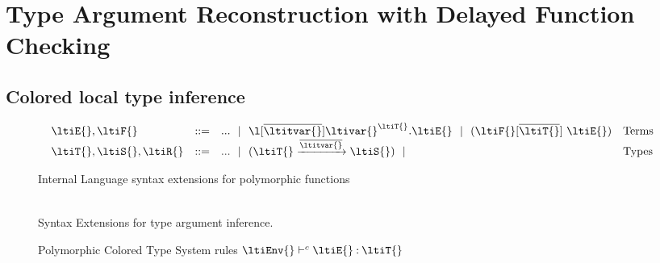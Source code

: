 
\chapter{Type Argument Reconstruction with Delayed Function Checking}
\label{chapter:symbolic:directed-lti}

\section{Colored local type inference}

\begin{figure}
$$
\begin{array}{lrll}
  \ltiE{}, \ltiF{} &::=& ... \alt
                         \ltifun{\ova{\ltitvar{}}}{\ltivar{}}{\ltiT{}}{\ltiE{}} \alt
                         \ltiappinst{\ltiF{}}{\ova{\ltiT{}}}{\ltiE{}}
                      &\mbox{Terms} \\
  \ltiT{}, \ltiS{}, \ltiR{} &::=& ... \alt
                         \ltiArrow{\ltiT{}}{\ova{\ltitvar{}}}{\ltiS{}} \alt
                      &\mbox{Types} \\
\end{array}
$$
\caption{Internal Language syntax extensions for polymorphic functions}
\label{symbolic:figure:internal-language}
\end{figure}

\begin{figure}
$$
\begin{array}{lrll}
\end{array}
$$
\caption{Syntax Extensions for type argument inference.}
\end{figure}

\begin{figure}
  \begin{mathpar}

  \end{mathpar}
  \caption{Polymorphic Colored Type System rules
  $\lticjudgement{\ltiEnv{}}
                 {\ltiE{}}
                 {\ltiT{}}$
  }
\end{figure}

